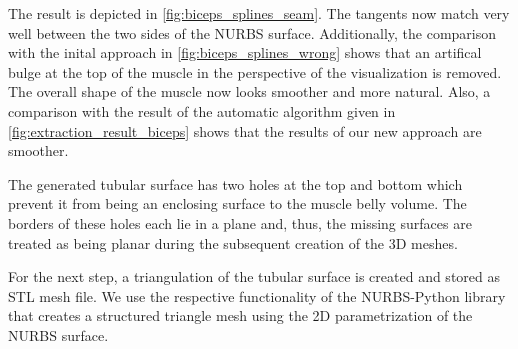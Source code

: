 The result is depicted in \cref{fig:biceps_splines_seam}. The tangents now match very well between the two sides of the NURBS surface. Additionally, the comparison with the inital approach in \cref{fig:biceps_splines_wrong} shows that an artifical bulge at the top of the muscle in the perspective of the visualization is removed. The overall shape of the muscle now looks smoother and more natural. Also, a comparison with the result of the automatic algorithm given in \cref{fig:extraction_result_biceps} shows that the results of our new approach are smoother.

The generated tubular surface has two holes at the top and bottom which prevent it from being an enclosing surface to the muscle belly volume. The borders of these holes each lie in a plane and, thus, the missing surfaces are treated as being planar during the subsequent creation of the 3D meshes.

For the next step, a triangulation of the tubular surface is created and stored as STL mesh file. We use the respective functionality of the NURBS-Python library that creates a structured triangle mesh using the 2D parametrization of the NURBS surface.

